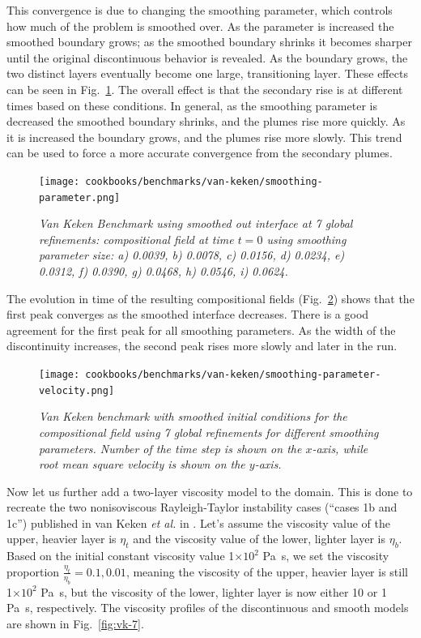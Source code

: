 \documentclass{article}
\begin{document}
This convergence is due to changing the smoothing parameter, which controls how much of the problem is smoothed over.  As the parameter is increased the smoothed boundary grows; as the smoothed boundary shrinks it becomes sharper until the original discontinuous behavior is revealed.  As the boundary grows, the two distinct layers eventually become one large, transitioning layer.  These effects can be seen in Fig.~\ref{fig:vk-5}.  The overall effect is that the secondary rise is at different times based on these conditions.  In general, as the smoothing parameter is decreased the smoothed boundary shrinks, and the plumes rise more quickly.  As it is increased the boundary grows, and the plumes rise more slowly.  This trend can be used to force a more accurate convergence from the secondary plumes.

\begin{figure}
        \centering
        \texttt{[image: cookbooks/benchmarks/van-keken/smoothing-parameter.png]}
        \caption{\it Van Keken Benchmark using smoothed out interface at 7 global refinements: compositional field at time $t=0$ using smoothing parameter size: a) 0.0039, b) 0.0078, c) 0.0156, d) 0.0234, e) 0.0312, f) 0.0390, g) 0.0468, h) 0.0546, i) 0.0624.}
        \label{fig:vk-5}
\end{figure}

The evolution in time of the resulting compositional fields (Fig.~\ref{fig:vk-6}) shows that the first peak converges as the smoothed interface decreases. There is a good agreement for the first peak for all smoothing parameters.  As the width of the discontinuity increases, the second peak rises more slowly and later in the run.

\begin{figure}
        \centering
        \texttt{[image: cookbooks/benchmarks/van-keken/smoothing-parameter-velocity.png]}
        \caption{\it Van Keken benchmark with smoothed initial conditions for the compositional field using 7 global refinements for different smoothing parameters.  Number of the time step is shown on the $x$-axis, while root mean square velocity is shown on the $y$-axis.}
        \label{fig:vk-6}
\end{figure}

Now let us further add a two-layer viscosity model to the domain. This is done to recreate the two nonisoviscous Rayleigh-Taylor instability cases (``cases 1b and 1c'') published in van Keken \textit{et al.} in \cite{KKSCND97}.  Let's assume the viscosity value of the upper, heavier layer is $\eta_{t}$ and the viscosity value of the lower, lighter layer is $\eta_{b}$. Based on the initial constant viscosity value 1$\times10^{2}$ Pa~s, we set the viscosity proportion $\frac{\eta_{t}}{\eta_{b}}=0.1, 0.01$, meaning the viscosity of the upper, heavier layer is still 1$\times10^{2}$ Pa~s, but the viscosity of the lower, lighter layer is now either 10 or 1 Pa~s, respectively. The viscosity profiles of the discontinuous and smooth models are shown in Fig.~\ref{fig:vk-7}.
\end{document}
